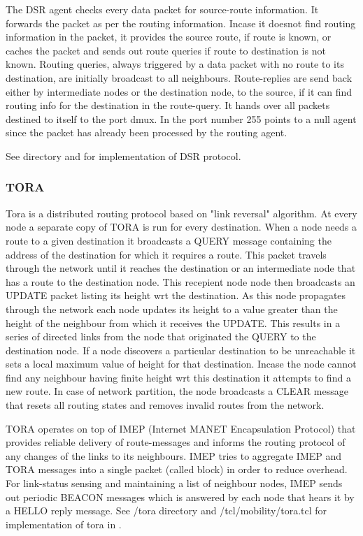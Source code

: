 The DSR agent checks every data packet for source-route information. It
forwards the packet as per the routing information. Incase it doesnot find
routing information in the packet, it provides the source route, if route
is known, or caches the packet and   
sends out route queries if route to destination is not known. Routing
queries, always triggered by a data packet with no route to its
destination, are initially broadcast to all neighbours. Route-replies are
send back either by intermediate nodes or the 
destination node, to the source, if it can find routing info for the
destination in the route-query.  It hands over all packets destined to
itself to the port dmux.  
In  the port number 255 points to a null agent since the
packet has already been processed by the routing agent. 

See  directory and  for implementation
of DSR protocol. 

\subsubsection{TORA}
\label{sec:tora}

Tora is a distributed routing protocol based on "link reversal" algorithm. 
At every node a separate copy of TORA is run for every destination. When a
node needs a route to a given destination it broadcasts a QUERY message
containing the address of the destination for which it requires  a route.
This packet travels through the network until it reaches the destination
or an intermediate node that has a route to the destination node.
This recepient node node then broadcasts an UPDATE packet listing its
height wrt the destination. As this node propagates through the network
each node updates its height to a value greater than the height of the
neighbour from which it receives the UPDATE. This results in a series of
directed links from the node that originated the QUERY to the destination
node. If a node discovers a particular destination to be unreachable it
sets a local maximum value of height for that destination. Incase the node
cannot find any neighbour having finite height wrt this destination it
attempts to find a new route. In case of network partition, the node
broadcasts a CLEAR message that resets all routing states and removes
invalid routes from the network.

TORA operates on top of IMEP (Internet MANET Encapsulation Protocol) that
provides reliable delivery of route-messages and informs the routing
protocol of any changes of the links to its neighbours. IMEP tries to
aggregate IMEP and TORA messages into a single packet (called block) in
order to reduce overhead. For link-status sensing and maintaining a list
of neighbour nodes, IMEP sends out periodic BEACON messages which is
answered by each node that hears it by a HELLO reply message.
See \ns/tora directory and \ns/tcl/mobility/tora.tcl for implementation of
tora in \ns.

